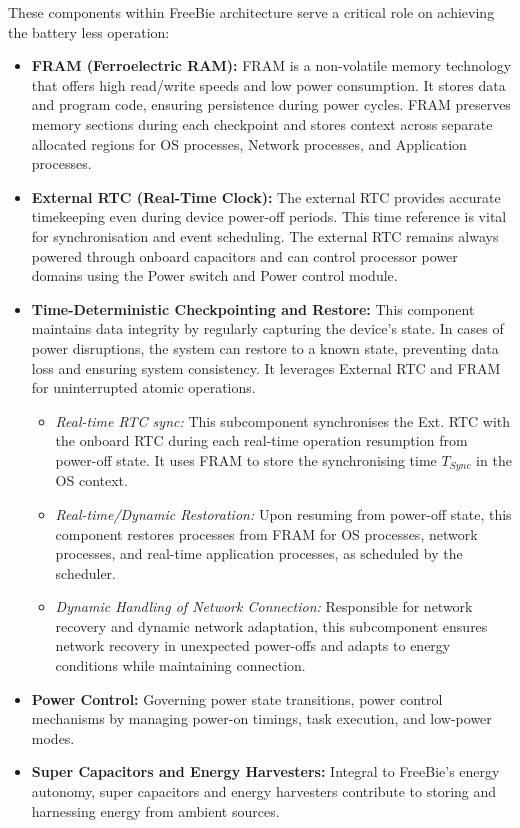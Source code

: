 \noindent These components within FreeBie architecture serve a critical role on achieving the battery less operation:
\begin{itemize}
    \item \textbf{FRAM (Ferroelectric RAM):} FRAM is a non-volatile memory technology that offers high read/write speeds and low power consumption. It stores data and program code, ensuring persistence during power cycles. FRAM preserves memory sections during each checkpoint and stores context across separate allocated regions for OS processes, Network processes, and Application processes.
    
    \item \textbf{External RTC (Real-Time Clock):} The external RTC provides accurate timekeeping even during device power-off periods. This time reference is vital for synchronisation and event scheduling. The external RTC remains always powered through onboard capacitors and can control processor power domains using the Power switch and Power control module.
    
    \item \textbf{Time-Deterministic Checkpointing and Restore:} This component maintains data integrity by regularly capturing the device's state. In cases of power disruptions, the system can restore to a known state, preventing data loss and ensuring system consistency. It leverages External RTC and FRAM for uninterrupted atomic operations.
    
    \begin{itemize}
        \item \textit{Real-time RTC sync:} This subcomponent synchronises the Ext. RTC with the onboard RTC during each real-time operation resumption from power-off state. It uses FRAM to store the synchronising time \(T_{Sync}\) in the OS context.
        \item \textit{Real-time/Dynamic Restoration:} Upon resuming from power-off state, this component restores processes from FRAM for OS processes, network processes, and real-time application processes, as scheduled by the scheduler.
        \item \textit{Dynamic Handling of Network Connection:} Responsible for network recovery and dynamic network adaptation, this subcomponent ensures network recovery in unexpected power-offs and adapts to energy conditions while maintaining connection.
    \end{itemize}
    
    \item \textbf{Power Control:} Governing power state transitions, power control mechanisms by managing power-on timings, task execution, and low-power modes.
    
    \item \textbf{Super Capacitors and Energy Harvesters:} Integral to FreeBie's energy autonomy, super capacitors and energy harvesters contribute to storing and harnessing energy from ambient sources.
\end{itemize}

